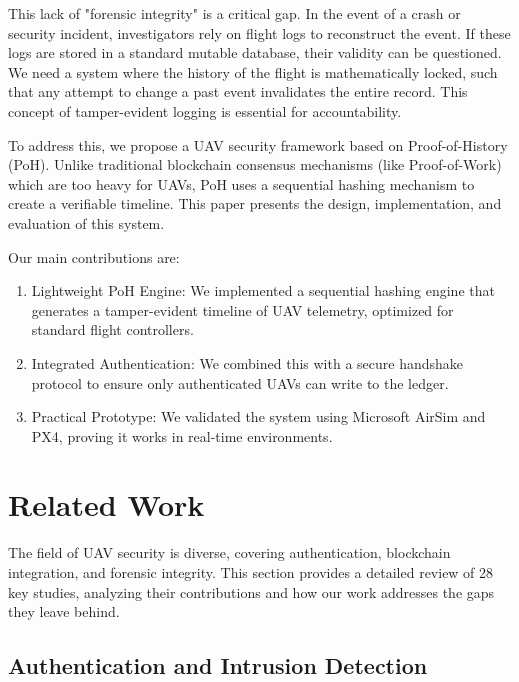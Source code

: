 \documentclass[preprint,12pt]{elsarticle}
\begin{document}
This lack of "forensic integrity" is a critical gap. In the event of a crash or security incident, investigators rely on flight logs to reconstruct the event. If these logs are stored in a standard mutable database, their validity can be questioned. We need a system where the history of the flight is mathematically locked, such that any attempt to change a past event invalidates the entire record. This concept of tamper-evident logging is essential for accountability.


To address this, we propose a UAV security framework based on Proof-of-History (PoH). Unlike traditional blockchain consensus mechanisms (like Proof-of-Work) which are too heavy for UAVs, PoH uses a sequential hashing mechanism to create a verifiable timeline. This paper presents the design, implementation, and evaluation of this system.


Our main contributions are:
\begin{enumerate}
    \item {Lightweight PoH Engine:} We implemented a sequential hashing engine that generates a tamper-evident timeline of UAV telemetry, optimized for standard flight controllers.
    \item {Integrated Authentication:} We combined this with a secure handshake protocol to ensure only authenticated UAVs can write to the ledger.
    \item {Practical Prototype:} We validated the system using Microsoft AirSim and PX4, proving it works in real-time environments.
\end{enumerate}


\section{Related Work}
The field of UAV security is diverse, covering authentication, blockchain integration, and forensic integrity. This section provides a detailed review of 28 key studies, analyzing their contributions and how our work addresses the gaps they leave behind.
\label{sec2}

\subsection{Authentication and Intrusion Detection}
\label{subsec2-1}
\end{document}
